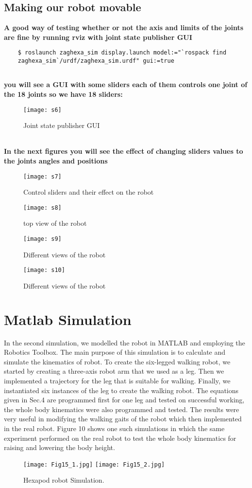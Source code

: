 	\subsection{Making our robot movable}
	\textbf{A good way of testing whether or not the axis and limits of the joints are fine by running rviz with joint state publisher GUI}
	\begin{lstlisting}
	$ roslaunch zaghexa_sim display.launch model:="`rospack find
	zaghexa_sim`/urdf/zaghexa_sim.urdf" gui:=true
	
	\end{lstlisting}
	\textbf{you will see a GUI with some sliders each of them controls one joint of the 18 joints so we have 18 sliders:}
	\begin{figure}[h]
		\centering
		\texttt{[image: s6]}
		\caption{Joint state publisher GUI}
		\label{fig:s6}
	\end{figure}
	\\\textbf{In the next figures you will see the effect of changing sliders values to the joints angles and positions}
	\begin{figure}[h]
		\centering
		\texttt{[image: s7]}
		\caption{Control sliders and their effect on the robot }
		\label{fig:s7}
	\end{figure}
	\begin{figure}[htb]
		\centering
		\texttt{[image: s8]}
		\caption{top view of the robot}
		\label{fig:s8}
		\texttt{[image: s9]}
		\caption{Different views of the robot}
		\label{fig:s9}
		\texttt{[image: s10]}
		\caption{Different views of the robot}
		\label{fig:s10}
	\end{figure}
\clearpage
\vspace{10cm}
\section{ Matlab Simulation}
In the second simulation, we modelled the robot in MATLAB and employing the Robotics Toolbox. The main purpose of this simulation is to calculate and simulate the kinematics of robot. To create the six-legged walking robot, we started by creating a three-axis robot arm that we used as a leg. Then we implemented a trajectory for the leg that is suitable for walking. Finally, we instantiated six instances of the leg to create the walking robot. The equations given in Sec.4 are programmed first for one leg and tested on successful working, the whole body kinematics were also programmed and tested.
The results were very useful in modifying the walking gaits of the robot which then implemented in the real robot. Figure 10 shows one such simulations in which the same experiment performed on the real robot to test the whole body kinematics for raising and lowering the body height.
\begin{figure}[h]
	\centering
	\texttt{[image: Fig15\_1.jpg]} 
	\texttt{[image: Fig15\_2.jpg]}
	\caption{ Hexapod robot Simulation.}
	\label{sim}
\end{figure}

